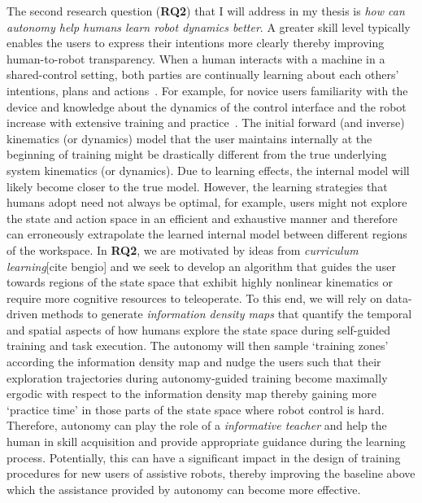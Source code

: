 \documentclass[12pt]{article}
\begin{document}
The second research question (\textbf{RQ2}) that I will address in my thesis is \textit{how can autonomy help humans learn robot dynamics better}.   A greater skill level typically enables the users to express their intentions more clearly thereby improving human-to-robot transparency. When a human interacts with a machine in a shared-control setting, both parties are continually learning about each others' intentions, plans and actions~\cite{ikemoto2012physical}. For example, for novice users familiarity with the device and knowledge about the dynamics of the control interface and the robot increase with extensive training and practice~\cite{mussaivaldi2000motor}. The initial forward (and inverse) kinematics (or dynamics) model that the user maintains internally at the beginning of training might be drastically different from the true underlying system kinematics (or dynamics). Due to learning effects, the internal model will likely become closer to the true model. However, the learning strategies that humans adopt need not always be optimal, for example, users might not explore the state and action space in an efficient and exhaustive manner and therefore can erroneously extrapolate the learned internal model between different regions of the workspace. In \textbf{RQ2}, we are motivated by ideas from \textit{curriculum learning}[cite bengio] and we seek to develop an algorithm that guides the user towards regions of the state space that exhibit highly nonlinear kinematics or require more cognitive resources to teleoperate. To this end, we will rely on data-driven methods to generate  \textit{information density maps} that quantify the temporal and spatial aspects of how humans explore the state space during self-guided training and task execution. The autonomy will then sample `training zones' according the information density map and nudge the users such that their exploration trajectories during autonomy-guided training become maximally ergodic with respect to the information density map thereby gaining more `practice time' in those parts of the state space where robot control is hard. Therefore, autonomy can play the role of a \textit{informative teacher} and help the human in skill acquisition and provide appropriate guidance during the learning process. Potentially, this can have a significant impact in the design of training procedures for new users of assistive robots, thereby improving the baseline above which the assistance provided by autonomy can become more effective. 
\end{document}
